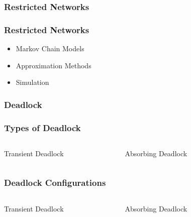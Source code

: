 \documentclass[xcolor={table}]{beamer}
\begin{document}
\begin{frame}
  \frametitle{Restricted Networks}
  \begin{figure}
  
  \end{figure}
\end{frame}

\begin{frame}
  \frametitle{Restricted Networks}
  \begin{itemize}
    \item Markov Chain Models
    \item Approximation Methods
    \item Simulation
  \end{itemize}
\end{frame}



\begin{frame}
    \frametitle{Deadlock}
    \begin{figure}
    
    \end{figure}
\end{frame}

\begin{frame}
    \begin{figure}
    
    \end{figure}
\end{frame}

\begin{frame}
    \frametitle{Types of Deadlock}
    \begin{columns}
        \center
        Transient Deadlock
        \begin{figure}
        
        \end{figure}
        \center
        Absorbing Deadlock
        \begin{figure}
        
        \end{figure}
    \end{columns}
\end{frame}

\begin{frame}
    \frametitle{Deadlock Configurations}
    \begin{columns}
        \center
        Transient Deadlock
        \begin{figure}
        
        \end{figure}
        \center
        Absorbing Deadlock
        \begin{figure}
        
        \end{figure}
    \end{columns}
\end{frame}
\end{document}
